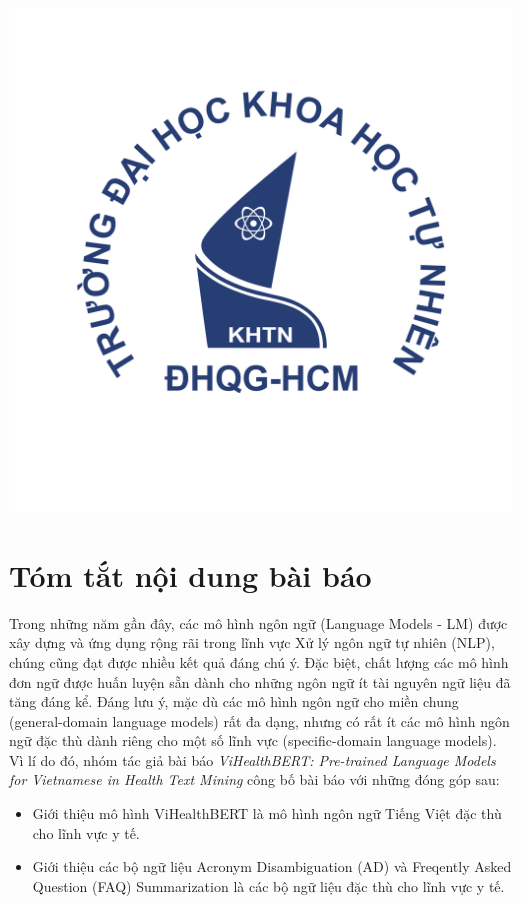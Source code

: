 \documentclass[12pt]{article}
\begin{document}
\begin{titlepage}
\includegraphics[scale=.3]{img/hcmus-logo.png}\\[1cm] 

\vfill
\end{titlepage}


\tableofcontents
\pagebreak

\section{Tóm tắt nội dung bài báo}
Trong những năm gần đây, các mô hình ngôn ngữ (Language Models - LM) được xây dựng và ứng dụng rộng rãi trong lĩnh vực Xử lý ngôn ngữ tự nhiên (NLP), chúng cũng đạt được nhiều kết quả đáng chú ý. Đặc biệt, chất lượng các mô hình đơn ngữ được huấn luyện sẵn dành cho những ngôn ngữ ít tài nguyên ngữ liệu đã tăng đáng kể. Đáng lưu ý, mặc dù các mô hình ngôn ngữ cho miền chung (general-domain language models) rất đa dạng, nhưng có rất ít các mô hình ngôn ngữ đặc thù dành riêng cho một số lĩnh vực (specific-domain language models). Vì lí do đó, nhóm tác giả bài báo \textit{ViHealthBERT: Pre-trained Language Models for Vietnamese in Health Text Mining}\cite{minh-EtAl:2022:LREC} công bố bài báo với những đóng góp sau:
\begin{itemize}
\item Giới thiệu mô hình ViHealthBERT là mô hình ngôn ngữ Tiếng Việt đặc thù cho lĩnh vực y tế.
\item Giới thiệu các bộ ngữ liệu Acronym Disambiguation (AD) và Freqently Asked Question (FAQ) Summarization là các bộ ngữ liệu đặc thù cho lĩnh vực y tế.
\end{itemize}
\end{document}
